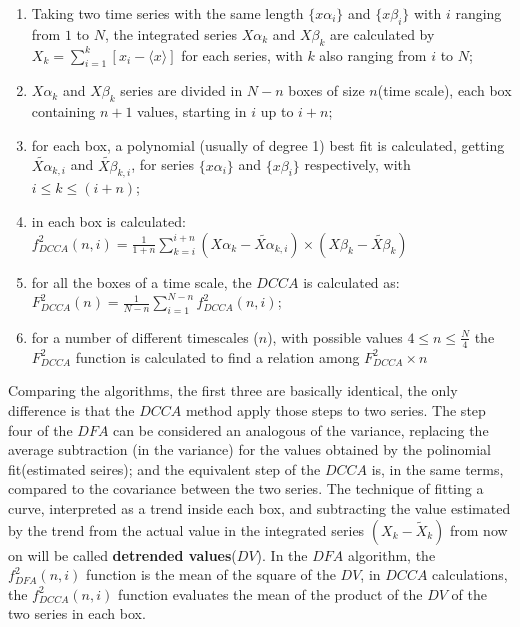 \documentclass[article]{jss}
\begin{document}
\begin{enumerate}
  \label{steps:DCCA}
  \item Taking two time series with the same length $\{x\alpha_{i}\}$ and $\{x\beta_{i}\}$ with $i$ ranging from $1$ to $N$,
        the integrated series $X\alpha_{k}$ and $X\beta_{k}$ are calculated by
        $X_{k} = \sum_{i=1}^{k}\left[x_{i} - \langle x \rangle \right] $ for each series, with $k$ also ranging from $i$ to $N$;
  \item $X\alpha_{k}$ and $X\beta_{k}$ series are divided in $N - n$ boxes of size $n$(time scale), each box containing $n + 1$ values, starting in $i$ up to $i + n$;
  \item for each box, a polynomial (usually of degree 1) best fit is calculated, getting
        $\widetilde{X\alpha}_{k, i}$ and $\widetilde{X\beta}_{k, i}$,
        for series $\{x\alpha_{i}\}$ and $\{x\beta_{i}\}$ respectively,
        with $i \le k \le (i + n)$;
  \item in each box is calculated: $f_{DCCA}^{2}(n, i) =
          \frac{1}{1+n} \sum_{k=i}^{i + n}(X\alpha_{k}-\widetilde{X\alpha}_{k, i}) \times (X\beta_{k}-\widetilde{X\beta}_{k})$
  \item for all the boxes of a time scale, the $DCCA$ is calculated as:\\[10pt]
        $F_{DCCA}^{2}(n) =\frac{1}{N - n} \sum_{i=1}^{N-n} f_{DCCA}^{2}(n, i)$;
  \item for a number of different timescales ($n$), with possible values
        $4 \le n \le \frac{N}{4}$ the $F_{DCCA}^{2}$ function is calculated to find a relation among
        $F_{DCCA}^{2} \times n$
\end{enumerate}

Comparing the algorithms, the first three are basically identical, the only difference is that the $DCCA$ method apply those steps to two series. The step four of the $DFA$ can be considered an analogous of the variance, replacing the average subtraction (in the variance) for the values obtained by the polinomial fit(estimated seires); and the equivalent step of the $DCCA$ is, in the same terms, compared to the covariance between the two series. The technique of fitting a curve, interpreted as a trend inside each box, and subtracting the value estimated by the trend from the actual value in the integrated series $(X_{k}-\widetilde{X}_{k})$ from now on will be called \textbf{detrended values}($DV$). In the $DFA$ algorithm, the $f_{DFA}^{2}(n, i)$ function is the mean of the square of the $DV$, in $DCCA$ calculations, the $f_{DCCA}^{2}(n, i)$ function evaluates the mean of the product of the $DV$ of the two series in each box.
\end{document}

